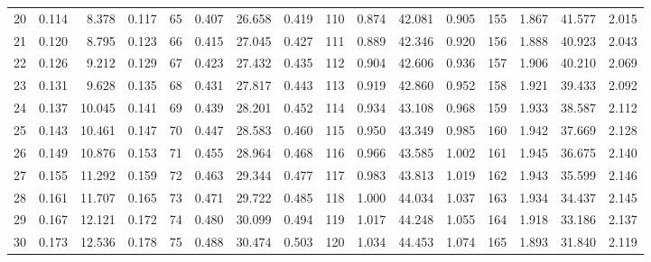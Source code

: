\begin{table}
{\begin{tabular}{rrrr|rrrr|rrrr|rrrr}
 20 & \tiny{  0.114} &   8.378 & \tiny{  0.117} &  65 & \tiny{  0.407} &  26.658 & \tiny{  0.419} & 110 & \tiny{  0.874} &  42.081 & \tiny{  0.905} & 155 & \tiny{  1.867} &  41.577 & \tiny{  2.015}\\
 21 & \tiny{  0.120} &   8.795 & \tiny{  0.123} &  66 & \tiny{  0.415} &  27.045 & \tiny{  0.427} & 111 & \tiny{  0.889} &  42.346 & \tiny{  0.920} & 156 & \tiny{  1.888} &  40.923 & \tiny{  2.043}\\
 22 & \tiny{  0.126} &   9.212 & \tiny{  0.129} &  67 & \tiny{  0.423} &  27.432 & \tiny{  0.435} & 112 & \tiny{  0.904} &  42.606 & \tiny{  0.936} & 157 & \tiny{  1.906} &  40.210 & \tiny{  2.069}\\
 23 & \tiny{  0.131} &   9.628 & \tiny{  0.135} &  68 & \tiny{  0.431} &  27.817 & \tiny{  0.443} & 113 & \tiny{  0.919} &  42.860 & \tiny{  0.952} & 158 & \tiny{  1.921} &  39.433 & \tiny{  2.092}\\
 24 & \tiny{  0.137} &  10.045 & \tiny{  0.141} &  69 & \tiny{  0.439} &  28.201 & \tiny{  0.452} & 114 & \tiny{  0.934} &  43.108 & \tiny{  0.968} & 159 & \tiny{  1.933} &  38.587 & \tiny{  2.112}\\
 25 & \tiny{  0.143} &  10.461 & \tiny{  0.147} &  70 & \tiny{  0.447} &  28.583 & \tiny{  0.460} & 115 & \tiny{  0.950} &  43.349 & \tiny{  0.985} & 160 & \tiny{  1.942} &  37.669 & \tiny{  2.128}\\
 26 & \tiny{  0.149} &  10.876 & \tiny{  0.153} &  71 & \tiny{  0.455} &  28.964 & \tiny{  0.468} & 116 & \tiny{  0.966} &  43.585 & \tiny{  1.002} & 161 & \tiny{  1.945} &  36.675 & \tiny{  2.140}\\
 27 & \tiny{  0.155} &  11.292 & \tiny{  0.159} &  72 & \tiny{  0.463} &  29.344 & \tiny{  0.477} & 117 & \tiny{  0.983} &  43.813 & \tiny{  1.019} & 162 & \tiny{  1.943} &  35.599 & \tiny{  2.146}\\
 28 & \tiny{  0.161} &  11.707 & \tiny{  0.165} &  73 & \tiny{  0.471} &  29.722 & \tiny{  0.485} & 118 & \tiny{  1.000} &  44.034 & \tiny{  1.037} & 163 & \tiny{  1.934} &  34.437 & \tiny{  2.145}\\
 29 & \tiny{  0.167} &  12.121 & \tiny{  0.172} &  74 & \tiny{  0.480} &  30.099 & \tiny{  0.494} & 119 & \tiny{  1.017} &  44.248 & \tiny{  1.055} & 164 & \tiny{  1.918} &  33.186 & \tiny{  2.137}\\
 30 & \tiny{  0.173} &  12.536 & \tiny{  0.178} &  75 & \tiny{  0.488} &  30.474 & \tiny{  0.503} & 120 & \tiny{  1.034} &  44.453 & \tiny{  1.074} & 165 & \tiny{  1.893} &  31.840 & \tiny{  2.119}\\

\end{tabular}}
\end{table}
